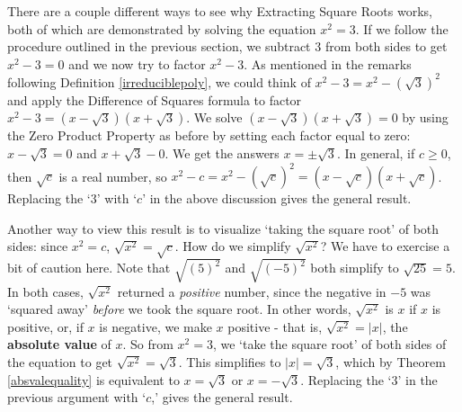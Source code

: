 \documentclass[10pt]{article}
\begin{document}
\medskip

There are a couple different ways to see why Extracting Square Roots works, both of which are demonstrated by solving the equation $x^2 = 3$.  If we follow the procedure outlined in the previous section, we subtract $3$ from both sides to get $x^2 - 3 = 0$ and we now try to factor $x^2 - 3$.   As mentioned in the remarks following Definition \ref{irreduciblepoly}, we could think of $x^2 - 3 = x^2 - (\sqrt{3})^2$ and apply the Difference of Squares formula to factor $x^2 - 3 = (x-\sqrt{3})(x+\sqrt{3})$.  We solve $(x-\sqrt{3})(x+\sqrt{3}) = 0$ by using the Zero Product Property as before by setting each factor equal to zero:  $x - \sqrt{3} = 0$ and $x+\sqrt{3} - 0$.  We get the answers $x = \pm \sqrt{3}$.  In general,  if $c \geq 0$, then $\sqrt{c}$ is a real number, so  $x^2 - c = x^2 - (\sqrt{c})^2 = (x-\sqrt{c})(x+\sqrt{c})$.  Replacing the `$3$' with `$c$' in the above discussion gives the general result. 

\smallskip

Another way to view this result is to visualize  `taking the square root' of both sides:   since $x^2 = c$,  $\sqrt{x^2} = \sqrt{c}$.  How do we simplify $\sqrt{x^2}$? We have to exercise a bit of caution here.  Note that $\sqrt{(5)^2}$ and $\sqrt{(-5)^2}$ both simplify to  $\sqrt{25} = 5$.  In both cases, $\sqrt{x^2}$ returned a \textit{positive} number, since the negative in $-5$ was `squared away' \textit{before} we took the square root.  In other words, $\sqrt{x^2}$ is $x$ if $x$ is positive, or, if $x$ is negative, we make $x$ positive - that is, $\sqrt{x^2} = |x|$, the \textbf{absolute value} of $x$.  So from $x^2 = 3$, we `take the square root' of both sides of the equation to get $\sqrt{x^2} = \sqrt{3}$.  This simplifies to $|x| = \sqrt{3}$, which by Theorem \ref{absvalequality} is equivalent to $x = \sqrt{3}$ or $x = -\sqrt{3}$.  Replacing the `$3$' in the previous argument with `$c$,' gives the general result.

\smallskip
\end{document}
